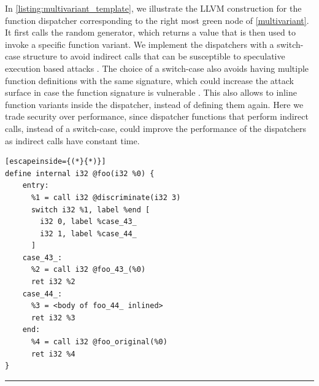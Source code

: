 In  \autoref{listing:multivariant_template}, we illustrate the LLVM construction for the function dispatcher corresponding to the right most green node of \autoref{multivariant}.
It first calls the random generator, which returns a value that is then used to invoke a specific function variant. 
We implement the dispatchers with a switch-case structure to avoid indirect calls that can be susceptible to speculative execution based attacks \cite{Narayan2021Swivel}. 
The choice of a switch-case also avoids having multiple function definitions with the same signature, which could increase the attack surface in case the function signature is vulnerable \cite{johnson2021}.
This also allows \tool to inline function variants inside the dispatcher, instead of defining them again.
Here we trade security over performance, since dispatcher functions  that perform indirect calls, instead of a switch-case,  could improve the performance  of the dispatchers as indirect calls have constant time.


\lstset{
    language=llvm,
    basicstyle=\footnotesize\ttfamily,
    columns=fullflexible,
    breaklines=true,
    numbers=none,
    stepnumber=1,
    float
}

\begin{code}
\scriptsize
\noindent\begin{minipage}[b]{\linewidth}
    \begin{minipage}[t]{1\linewidth}
        \begin{lstlisting}[escapeinside={(*}{*)}]
define internal i32 @foo(i32 %0) {
    entry:
      %1 = call i32 @discriminate(i32 3)
      switch i32 %1, label %end [
        i32 0, label %case_43_
        i32 1, label %case_44_
      ]
    case_43_:                 
      %2 = call i32 @foo_43_(%0)
      ret i32 %2
    case_44_:                
      %3 = <body of foo_44_ inlined>
      ret i32 %3
    end:                                             
      %4 = call i32 @foo_original(%0)
      ret i32 %4
}
        \end{lstlisting}
    \end{minipage}%
    
    \noindent\rule{\linewidth}{0.4pt}
    \label{listing:multivariant_template}
\end{minipage}
\end{code}

